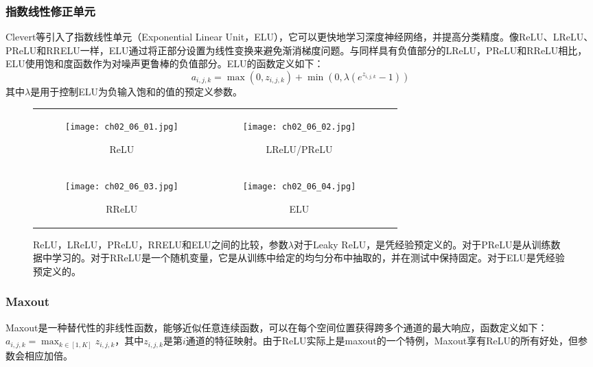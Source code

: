 \subsubsection{指数线性修正单元}
Clevert等\cite{Clevert2015}引入了指数线性单元（Exponential Linear Unit，ELU），它可以更快地学习深度神经网络，并提高分类精度。像ReLU、LReLU、PReLU和RRELU一样，ELU通过将正部分设置为线性变换来避免渐消梯度问题。与同样具有负值部分的LReLU，PReLU和RReLU相比，ELU使用饱和度函数作为对噪声更鲁棒的负值部分。ELU的函数定义如下：
\begin{equation}\label{eq:ELU}
    a_{i,j,k}=\max(0,z_{i,j,k})+\min(0,\lambda(e^{z_{i,j,k}}-1))
\end{equation}
其中$ \lambda $是用于控制ELU为负输入饱和的值的预定义参数。
\begin{figure}
	\centering
	\begin{tabular}[c]{ccc}
		\begin{subfigure}[c]{0.25\textwidth}
			\texttt{[image: ch02\_06\_01.jpg]}
			\caption{ReLU}
			\label{fig:ReLU}
		\end{subfigure}&
		\begin{subfigure}[c]{0.25\textwidth}
			\texttt{[image: ch02\_06\_02.jpg]}
			\caption{LReLU/PReLU}
			\label{fig:PReLU}
		\end{subfigure}\\
		\begin{subfigure}[c]{0.25\textwidth}
			\texttt{[image: ch02\_06\_03.jpg]}
			\caption{RReLU}
			\label{fig:RReLU}	
		\end{subfigure}&
		\begin{subfigure}[c]{0.25\textwidth}
			\texttt{[image: ch02\_06\_04.jpg]}
			\caption{ELU}
			\label{fig:ELU}	
		\end{subfigure}				
	\end{tabular}    
	\caption[各种激活函数比较图]{ReLU，LReLU，PReLU，RRELU和ELU之间的比较，参数$\lambda $对于Leaky ReLU，是凭经验预定义的。对于PReLU是从训练数据中学习的。对于RReLU是一个随机变量，它是从训练中给定的均匀分布中抽取的，并在测试中保持固定。对于ELU是凭经验预定义的。}
	\label{fig:RRELU}
\end{figure}

\subsubsection{Maxout}
Maxout\cite{Goodfellow2014Generative}是一种替代性的非线性函数，能够近似任意连续函数，可以在每个空间位置获得跨多个通道的最大响应，函数定义如下：
$ a_{i,j,k}=\max_{k \in[1,K]}z_{i,j,k}$，其中$ z_{i,j,k} $是第$ i $通道的特征映射。由于ReLU实际上是maxout的一个特例，Maxout享有ReLU的所有好处，但参数会相应加倍。
